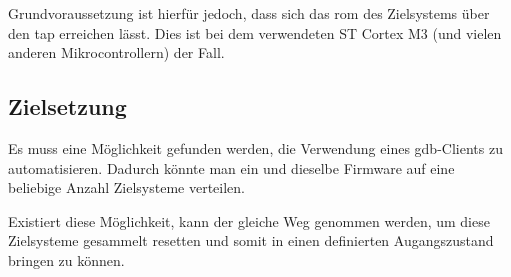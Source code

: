 Grundvoraussetzung ist hierfür jedoch, dass sich das \gls{rom} des Zielsystems
über den \gls{tap} erreichen lässt. Dies ist bei dem verwendeten ST Cortex M3
(und vielen anderen Mikrocontrollern) der Fall.
\subsection{Zielsetzung}
Es muss eine Möglichkeit gefunden werden, die Verwendung eines \gls{gdb}-Clients
zu automatisieren. Dadurch könnte man ein und dieselbe Firmware auf eine
beliebige Anzahl Zielsysteme verteilen.

Existiert diese Möglichkeit, kann der gleiche Weg genommen werden, um diese
Zielsysteme gesammelt resetten und somit in einen definierten Augangszustand
bringen zu können.
